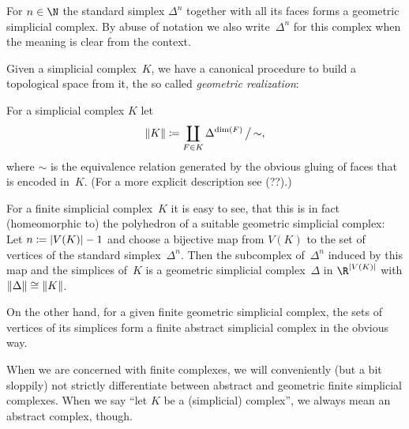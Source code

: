 \begin{thExample}
    For $n\in\N$ the standard simplex $\Delta^n$ together with all its faces
    forms a geometric simplicial complex. By abuse of notation we also
    write~$\Delta^n$ for this complex when the meaning is clear from the
    context.
\end{thExample}

Given a simplicial complex~$K$, we have a canonical procedure to build a
topological space from it, the so called \emph{geometric realization}:

\begin{thDef}
    For a simplicial complex $K$ let
    \[ \lVert K\rVert \coloneqq \coprod_{F\in K} \Delta^{\dim(F)} \,\big/\,{\sim}  , \]
    where $\sim$ is the equivalence relation generated by the obvious gluing
    of faces that is encoded in~$K$.
    (For a more explicit description see (??).) %
\end{thDef}

For a finite simplicial complex~$K$ it is easy to see, that this is in fact
(homeomorphic to) the polyhedron of a suitable geometric simplicial complex:
Let $n \coloneqq \lvert V(K)\rvert - 1$ and choose a bijective map from $V(K)$ to the
set of vertices of the standard simplex~$\Delta^n$. Then the subcomplex
of~$\Delta^n$ induced by this map and the simplices of~$K$ is a geometric
simplicial complex~$\Delta$ in $\R^{\abs{V(K)}}$ with $\lVert\Delta\rVert \cong
\lVert K\rVert$.

On the other hand, for a given finite geometric simplicial complex, the sets of
vertices of its simplices form a finite abstract simplicial complex in the
obvious way.

\begin{thConvention}
    When we are concerned with finite complexes, we will conveniently (but a bit
    sloppily) not strictly differentiate between abstract and geometric finite
    simplicial complexes.
    When we say \enquote{let $K$ be a (simplicial) complex}, we always mean an
    abstract complex, though.
%
%
\end{thConvention}

